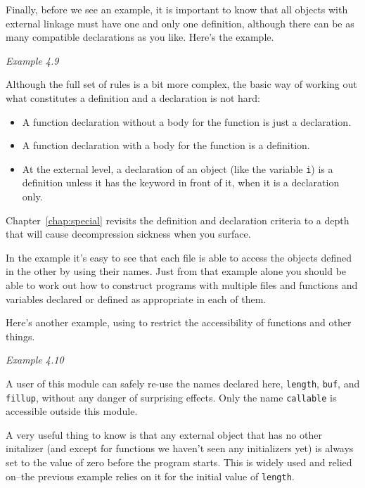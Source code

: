   Finally, before we see an example, it is important to know that all
   objects with external linkage must have one and only one definition,
   although there can be as many compatible declarations as you like. Here's
   the example.

   \begin{center}\textit{Example 4.9}\end{center}

  Although the full set of rules is a bit more complex, the basic way of
   working out what constitutes a definition and a declaration is not
   hard:

  \begin{itemize}
   \item A function declaration without a body for the function is just a
    declaration.
   \item A function declaration with a body for the function is a
    definition.
   \item At the external level, a declaration of an object (like the
    variable \texttt{i}) is a definition unless it has the keyword
    \extern{} in front of it, when it is a declaration only.
  \end{itemize}
  Chapter~\ref{chap:special} revisits the definition and declaration criteria
   to a depth that will cause decompression sickness when you surface.


  In the example it's easy to see that each file is able to access the
   objects defined in the other by using their names. Just from that example
   alone you should be able to work out how to construct programs with
   multiple files and functions and variables declared or defined as
   appropriate in each of them.


  Here's another example, using \static{} to restrict the
   accessibility of functions and other things.

   \begin{center}\textit{Example 4.10}\end{center}

  A user of this module can safely re-use the names declared here,
   \texttt{length}, \texttt{buf}, and \texttt{fillup}, without
   any danger of surprising effects. Only the name \texttt{callable} is
   accessible outside this module.


  A very useful thing to know is that any external object that has no
   other initalizer (and except for functions we haven't seen any
   initializers yet) is always set to the value of zero before the program
   starts. This is widely used and relied on--the previous example
   relies on it for the initial value of \texttt{length}.


